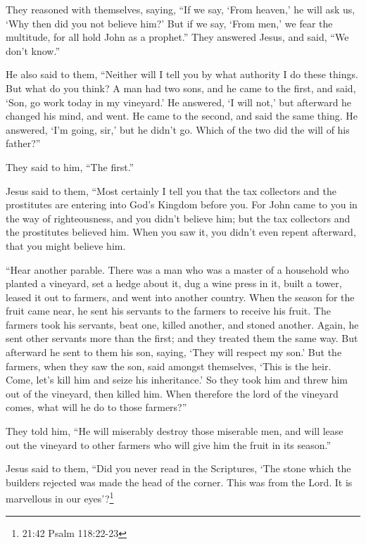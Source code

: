 They reasoned with themselves, saying, ``If we say, `From heaven,' he
will ask us, `Why then did you not believe him?'  But if we
say, `From men,' we fear the multitude, for all hold John as a
prophet.''  They answered Jesus, and said, ``We don't
know.''

He also said to them, ``Neither will I tell you by what authority I do
these things.  But what do you think? A man had two sons,
and he came to the first, and said, `Son, go work today in my vineyard.'
 He answered, `I will not,' but afterward he changed his
mind, and went.  He came to the second, and said the same
thing. He answered, `I'm going, sir,' but he didn't go. 
Which of the two did the will of his father?''

They said to him, ``The first.''

Jesus said to them, ``Most certainly I tell you that the tax collectors
and the prostitutes are entering into God's Kingdom before you.
 For John came to you in the way of righteousness, and you
didn't believe him; but the tax collectors and the prostitutes believed
him. When you saw it, you didn't even repent afterward, that you might
believe him.

 ``Hear another parable. There was a man who was a master
of a household who planted a vineyard, set a hedge about it, dug a wine
press in it, built a tower, leased it out to farmers, and went into
another country.  When the season for the fruit came near,
he sent his servants to the farmers to receive his fruit. 
The farmers took his servants, beat one, killed another, and stoned
another.  Again, he sent other servants more than the
first; and they treated them the same way.  But afterward
he sent to them his son, saying, `They will respect my son.'
 But the farmers, when they saw the son, said amongst
themselves, `This is the heir. Come, let's kill him and seize his
inheritance.'  So they took him and threw him out of the
vineyard, then killed him.  When therefore the lord of the
vineyard comes, what will he do to those farmers?''

 They told him, ``He will miserably destroy those miserable
men, and will lease out the vineyard to other farmers who will give him
the fruit in its season.''

 Jesus said to them, ``Did you never read in the
Scriptures, `The stone which the builders rejected was made the head of
the corner. This was from the Lord. It is marvellous in our
eyes'?\footnote{21:42 Psalm 118:22-23}

